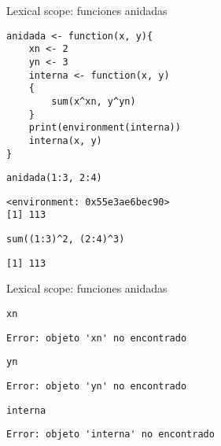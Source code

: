 \documentclass[xcolor={usenames,svgnames,dvipsnames}]{beamer}
\begin{document}
\begin{frame}[label={sec:org405410b},fragile]{Lexical scope: funciones anidadas}
 \lstset{language=r,label= ,caption= ,captionpos=b,numbers=none}
\begin{lstlisting}
anidada <- function(x, y){
    xn <- 2
    yn <- 3
    interna <- function(x, y)
    {
        sum(x^xn, y^yn)
    }
    print(environment(interna))
    interna(x, y)
}
\end{lstlisting}

\lstset{language=r,label= ,caption= ,captionpos=b,numbers=none}
\begin{lstlisting}
anidada(1:3, 2:4)
\end{lstlisting}

\begin{verbatim}
<environment: 0x55e3ae6bec90>
[1] 113
\end{verbatim}


\lstset{language=r,label= ,caption= ,captionpos=b,numbers=none}
\begin{lstlisting}
sum((1:3)^2, (2:4)^3)
\end{lstlisting}

\begin{verbatim}
[1] 113
\end{verbatim}
\end{frame}

\begin{frame}[label={sec:org1e90b54},fragile]{Lexical scope: funciones anidadas}
 \lstset{language=r,label= ,caption= ,captionpos=b,numbers=none}
\begin{lstlisting}
xn
\end{lstlisting}

\begin{verbatim}
Error: objeto 'xn' no encontrado
\end{verbatim}


\lstset{language=r,label= ,caption= ,captionpos=b,numbers=none}
\begin{lstlisting}
yn
\end{lstlisting}

\begin{verbatim}
Error: objeto 'yn' no encontrado
\end{verbatim}


\lstset{language=r,label= ,caption= ,captionpos=b,numbers=none}
\begin{lstlisting}
interna
\end{lstlisting}

\begin{verbatim}
Error: objeto 'interna' no encontrado
\end{verbatim}
\end{frame}
\end{document}
